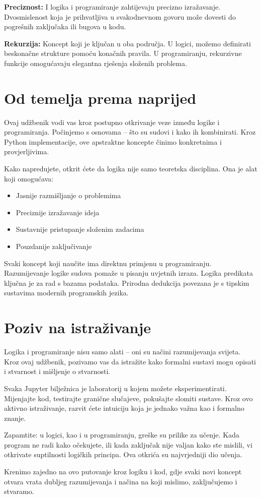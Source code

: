 \textbf{Preciznost:} I logika i programiranje zahtijevaju precizno izražavanje. Dvosmislenost koja je prihvatljiva u svakodnevnom govoru može dovesti do pogrešnih zaključaka ili bugova u kodu.

\textbf{Rekurzija:} Koncept koji je ključan u oba područja. U logici, možemo definirati beskonačne strukture pomoću konačnih pravila. U programiranju, rekurzivne funkcije omogućavaju elegantna rješenja složenih problema.

\section*{Od temelja prema naprijed}

Ovaj udžbenik vodi vas kroz postupno otkrivanje veze između logike i programiranja. Počinjemo s osnovama -- što su sudovi i kako ih kombinirati. Kroz Python implementacije, ove apstraktne koncepte činimo konkretnima i provjerljivima.

Kako napredujete, otkrit ćete da logika nije samo teoretska disciplina. Ona je alat koji omogućava:
\begin{itemize}
\item Jasnije razmišljanje o problemima
\item Preciznije izražavanje ideja
\item Sustavnije pristupanje složenim zadacima
\item Pouzdanije zaključivanje
\end{itemize}

Svaki koncept koji naučite ima direktnu primjenu u programiranju. Razumijevanje logike sudova pomaže u pisanju uvjetnih izraza. Logika predikata ključna je za rad s bazama podataka. Prirodna dedukcija povezana je s tipskim sustavima modernih programskih jezika.

\section*{Poziv na istraživanje}

Logika i programiranje nisu samo alati -- oni su načini razumijevanja svijeta. Kroz ovaj udžbenik, pozivamo vas da istražite kako formalni sustavi mogu opisati i stvarnost i mišljenje o stvarnosti.

Svaka Jupyter bilježnica je laboratorij u kojem možete eksperimentirati. Mijenjajte kod, testirajte granične slučajeve, pokušajte slomiti sustave. Kroz ovo aktivno istraživanje, razvit ćete intuiciju koja je jednako važna kao i formalno znanje.

Zapamtite: u logici, kao i u programiranju, greške su prilike za učenje. Kada program ne radi kako očekujete, ili kada zaključak nije valjan kako ste mislili, vi otkrivate suptilnosti logičkih principa. Ova otkrića su najvrjedniji dio učenja.

Krenimo zajedno na ovo putovanje kroz logiku i kod, gdje svaki novi koncept otvara vrata dubljeg razumijevanja i načina na koji mislimo, zaključujemo i stvaramo.

